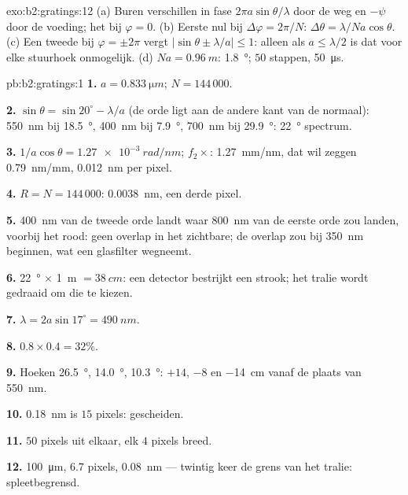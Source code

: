 \begin{solution}{exo:b2:gratings:12}
(a) Buren verschillen in fase $2\pi a\sin\theta/\lambda$ door de weg en $-\psi$
door de voeding; het  bij $\varphi = 0$. (b) Eerste nul bij
$\Delta\varphi = 2\pi/N$: $\Delta\theta = \lambda/Na\cos\theta$. (c) Een
tweede  bij
$\varphi = \pm2\pi$ vergt $|\sin\theta \pm \lambda/a| \le 1$: alleen als
$a \le \lambda/2$ is dat voor elke
stuurhoek onmogelijk. (d) $Na = \qty{0.96}{m}$: \qty{1.8}{\degree}; $50$ stappen,
\qty{50}{\micro s}.
\end{solution}

\begin{solution}{pb:b2:gratings:1}
\textbf{1.} $a = \qty{0.833}{\micro m}$; $N = 144\,000$.

\textbf{2.} $\sin\theta = \sin20^\circ - \lambda/a$ (de orde ligt aan de
andere kant van
de normaal): \qty{550}{nm} bij \qty{18.5}{\degree}, \qty{400}{nm} bij
\qty{7.9}{\degree}, \qty{700}{nm} bij
\qty{29.9}{\degree}: \qty{22}{\degree} spectrum.

\textbf{3.} $1/a\cos\theta = \qty{1.27e-3}{rad/nm}$; $f_2\times$:
\qty{1.27}{mm/nm}, dat wil zeggen
\qty{0.79}{nm/mm}, \qty{0.012}{nm} per pixel.

\textbf{4.} $R = N = 144\,000$: \qty{0.0038}{nm}, een derde pixel.

\textbf{5.} \qty{400}{nm} van de tweede orde landt waar \qty{800}{nm} van de
eerste orde
zou landen, voorbij het rood: geen overlap in het zichtbare; de overlap zou
bij \qty{350}{nm} beginnen, wat een glasfilter wegneemt.

\textbf{6.} \qty{22}{\degree} $\times$ \qty{1}{m} $= \qty{38}{cm}$: een
detector bestrijkt een strook;
het tralie wordt gedraaid om die te kiezen.

\textbf{7.} $\lambda = 2a\sin17^\circ = \qty{490}{nm}$.

\textbf{8.} $0.8 \times 0.4 = 32\%$.

\textbf{9.} Hoeken \qty{26.5}{\degree}, \qty{14.0}{\degree},
\qty{10.3}{\degree}: $+14$, $-8$ en
\qty{-14}{cm} vanaf de plaats van \qty{550}{nm}.

\textbf{10.} \qty{0.18}{nm} is $15$ pixels: gescheiden.

\textbf{11.} $50$ pixels uit elkaar, elk $4$ pixels breed.

\textbf{12.} \qty{100}{\micro m}, $6.7$ pixels, \qty{0.08}{nm} --- twintig keer de
grens van het tralie: spleetbegrensd.


\end{solution}
